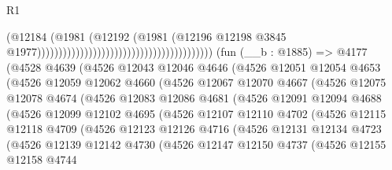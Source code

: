 \begin{lexlean}{R1}
\begin{coremodule}
                                                                            (@12184
                                                                              (@1981
                                                                                (@12192
                                                                                  (@1981
                                                                                    (@12196
                                                                                      @12198
                                                                                      @3845
                                                                                      @1977)))))))))))))))))))))))))))))))))))))))))
    (fun (__b : @1885) =>
    @4177
      (@4528
        @4639
        (@4526
          @12043
          @12046
          @4646
          (@4526
            @12051
            @12054
            @4653
            (@4526
              @12059
              @12062
              @4660
              (@4526
                @12067
                @12070
                @4667
                (@4526
                  @12075
                  @12078
                  @4674
                  (@4526
                    @12083
                    @12086
                    @4681
                    (@4526
                      @12091
                      @12094
                      @4688
                      (@4526
                        @12099
                        @12102
                        @4695
                        (@4526
                          @12107
                          @12110
                          @4702
                          (@4526
                            @12115
                            @12118
                            @4709
                            (@4526
                              @12123
                              @12126
                              @4716
                              (@4526
                                @12131
                                @12134
                                @4723
                                (@4526
                                  @12139
                                  @12142
                                  @4730
                                  (@4526
                                    @12147
                                    @12150
                                    @4737
                                    (@4526
                                      @12155
                                      @12158
                                      @4744

\end{coremodule}
\end{lexlean}
